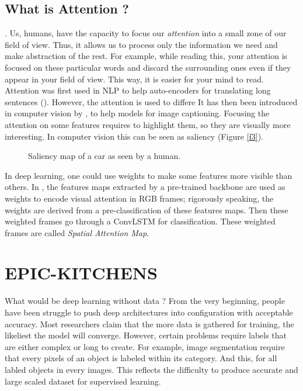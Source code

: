 \documentclass[12pt, a4paper]{report}
\begin{document}
	\subsection*{What is Attention ?}
	 \cite{sudhakaran}.
	Us, humans, have the capacity to focus our {\itshape attention} into a small zone of our field of view.
	Thus, it allows us to process only the information we need and make abstraction of the rest.
	For example, while reading this, your attention is focused on these particular words and discard the surrounding ones even if they appear in your field of view.
	This way, it is easier for your mind to read.
	Attention was first used in NLP to help auto-encoders for translating long sentences (\cite{bahdanau}).
	However, the attention is used to differe
	It has then been introduced in computer vision by \cite{xu}, to help models for image captioning.
	Focusing the attention on some features requires to highlight them, so they are visually more interesting.
	In computer vision this can be seen as \gls{saliency} (Figure \ref{f3}).
	\begin{figure}[!tbp]
		\centering
		\caption{Saliency map of a car as seen by a human.}
	\end{figure}
	In deep learning, one could use weights to make some features more visible than others.
	In \cite{sudhakaran_lanz}, the features maps extracted by a pre-trained backbone are used as weights to encode visual attention in RGB frames; rigorously speaking, the weights are derived from a pre-classification of these features maps.
	Then these weighted frames go through a ConvLSTM for classification.
	These weighted frames are called {\itshape Spatial Attention Map}.\\

	\section{EPIC-KITCHENS}
	What would be deep learning without data ?
	From the very beginning, people have been struggle to push deep architectures into configuration with acceptable accuracy.
	Most researchers claim that the more data is gathered for training, the likeliest the model will converge.
	However, certain problems require labels that are either complex or long to create.
	For example, image segmentation require that every pixels of an object is labeled within its category.
	And this, for all labled objects in every images.
	This reflects the difficulty to produce accurate and large scaled dataset for supervised learning.\\
	
\end{document}
